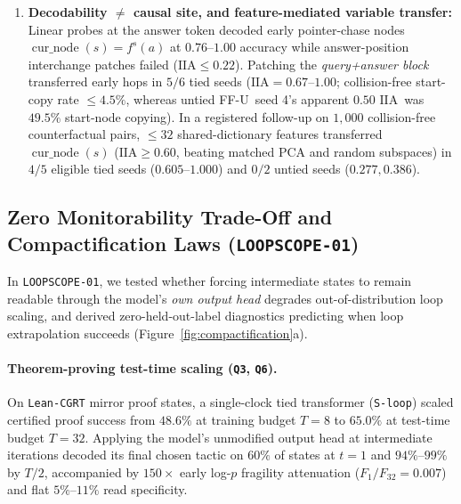 \documentclass[10pt,letterpaper]{article}
\newcommand{\FFU}{\textsc{FF-U}}
\newcommand{\IIA}{\ensuremath{\mathrm{IIA}}}
\newcommand{\cur}{\operatorname{cur\_node}}
\begin{document}
\begin{enumerate}[topsep=3pt,itemsep=2pt]
  \item \textbf{Decodability $\neq$ causal site, and feature-mediated variable transfer:} Linear probes at the answer token decoded early pointer-chase nodes $\cur(s)=f^s(a)$ at $0.76$--$1.00$ accuracy while answer-position interchange patches \cite{geiger2024das,makelov2024illusion} failed ($\IIA \le 0.22$). Patching the \emph{query+answer block} transferred early hops in $5/6$ tied seeds ($\IIA = 0.67$--$1.00$; collision-free start-copy rate $\le 4.5\%$, whereas untied \FFU\ seed 4's apparent $0.50$ \IIA\ was $49.5\%$ start-node copying). In a registered follow-up on $1{,}000$ collision-free counterfactual pairs, $\le 32$ shared-dictionary features transferred $\cur(s)$ ($\IIA \ge 0.60$, beating matched PCA and random subspaces) in $4/5$ eligible tied seeds ($0.605$--$1.000$) and $0/2$ untied seeds ($0.277, 0.386$).
\end{enumerate}

\subsection{Zero Monitorability Trade-Off and Compactification Laws (\texttt{LOOPSCOPE-01})}

In \texttt{LOOPSCOPE-01}, we tested whether forcing intermediate states to remain readable through the model's \emph{own output head} degrades out-of-distribution loop scaling, and derived zero-held-out-label diagnostics predicting when loop extrapolation succeeds (Figure~\ref{fig:compactification}a).

\paragraph{Theorem-proving test-time scaling (\texttt{Q3}, \texttt{Q6}).} On \texttt{Lean-CGRT} mirror proof states, a single-clock tied transformer (\texttt{S-loop}) scaled certified proof success from $48.6\%$ at training budget $T=8$ to $65.0\%$ at test-time budget $T=32$. Applying the model's unmodified output head at intermediate iterations decoded its final chosen tactic on $60\%$ of states at $t=1$ and $94\%$--$99\%$ by $T/2$, accompanied by $150\times$ early log-$p$ fragility attenuation ($F_1/F_{32} = 0.007$) and flat $5\%$--$11\%$ read specificity.
\end{document}
